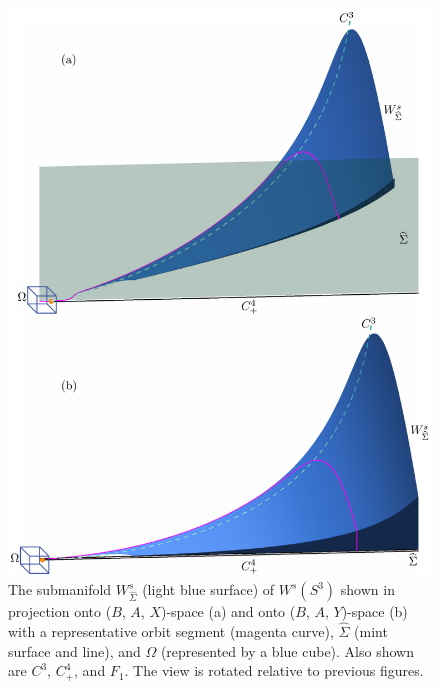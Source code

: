 \documentclass{ws-ijbc}
\begin{document}
\begin{figure}[H]
\centering
\includegraphics[]{./figures/MKMO_4.pdf}
\caption{The submanifold $W^{s}_{\widehat{\Sigma}}$ (light blue surface) of $W^s(S^3)$ shown in projection onto ($B$, $A$, $X$)-space (a) and onto ($B$, $A$, $Y$)-space (b) with a representative orbit segment (magenta curve), $\widehat{\Sigma}$ (mint surface and line), and $\Omega$ (represented by a blue cube).  Also shown are $C^3$, $C^4_+$, and $F_1$.  The view is rotated relative to previous figures.}
\label{figure_4}
\end{figure}
\end{document}
